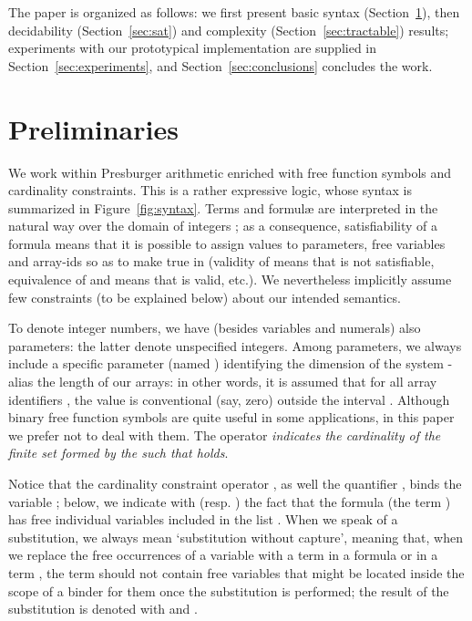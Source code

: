 \documentclass[11pt,a4paper]{article}
\newcommand{\formulae}{formul\ae\xspace}
\begin{document}
The paper is organized as follows: we first present basic syntax (Section~\ref{sec:preliminaries}), then decidability (Section~\ref{sec:sat})  and complexity (Section~\ref{sec:tractable}) results; 
experiments with our prototypical implementation are supplied in Section~\ref{sec:experiments}, and  Section~\ref{sec:conclusions} concludes the work.


\section{Preliminaries}\label{sec:preliminaries}

We work within Presburger arithmetic enriched with free function symbols and cardinality constraints. This is a rather expressive logic, whose syntax is summarized in Figure~\ref{fig:syntax}.
Terms and \formulae are interpreted in the natural way over the domain of integers ; as a consequence, satisfiability of a formula  means that it is 
possible to assign values to parameters, free variables and array-ids so as to make   true in  
(validity of  means that  is not satisfiable, equivalence of  and  means that  is valid, etc.). We nevertheless implicitly assume few constraints (to be explained below) 
about our intended semantics.

To denote integer numbers, we have (besides variables and numerals) also
parameters: the latter denote unspecified integers. 
Among parameters, we always include a specific parameter (named ) 
identifying
the dimension of the system - 
alias the length of our arrays: in other words, it is assumed that for all array identifiers , the value  is  conventional 
(say, zero) outside the interval .
Although binary free function symbols are quite useful in some applications, in this paper we prefer not
to deal with them.
The operator  \emph{indicates the cardinality of the 
finite set formed by the  such that  holds}.

Notice that the cardinality constraint operator , as 
well the  quantifier , 
binds the variable ;   
below, we indicate with  (resp. ) the fact that the formula  (the term ) has free individual variables included in the list . 
When we speak of a substitution, we always mean `substitution without capture', meaning that,
when we replace the free occurrences of a variable  with a term  in a formula
 or in a term  , 
the term  should not contain free variables that might be located inside  the scope of a 
binder for them once the substitution is performed; the result of the substitution is denoted with  and .
\end{document}
